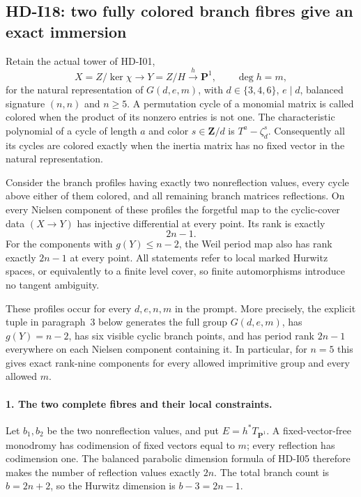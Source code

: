 \subsection{HD-I18: two fully colored branch fibres give an exact immersion}
\label{sec:HD-I18}

Retain the actual tower of HD-I01,
\[
 X=Z/\ker\chi\longrightarrow Y=Z/H
                 \xrightarrow{h}\mathbf P^1,
 \qquad \deg h=m,
\]
for the natural representation of $G(d,e,m)$, with
$d\in\{3,4,6\}$, $e\mid d$, balanced signature $(n,n)$ and
$n\geq5$. A permutation cycle of a monomial matrix is called
colored when the product of its nonzero entries is not one.
The characteristic polynomial of a cycle of length $a$ and color
$s\in\mathbf Z/d$ is $T^a-\zeta_d^s$. Consequently all its
cycles are colored exactly when the inertia matrix has no fixed
vector in the natural representation.

Consider the branch profiles having exactly two nonreflection
values, every cycle above either of them colored, and all remaining
branch matrices reflections. On every Nielsen component of these
profiles the forgetful map to the cyclic-cover data $(X\to Y)$ has
injective differential at every point. Its rank is exactly
\begin{equation}
                         2n-1.                       \tag{I18.1}
\end{equation}
For the components with $g(Y)\leq n-2$, the Weil period map also
has rank exactly $2n-1$ at every point. All statements refer to
local marked Hurwitz spaces, or equivalently to a finite level
cover, so finite automorphisms introduce no tangent ambiguity.

These profiles occur for every $d,e,n,m$ in the prompt. More
precisely, the explicit tuple in paragraph~3 below generates the
full group $G(d,e,m)$, has $g(Y)=n-2$, has six visible cyclic
branch points, and has period rank $2n-1$ everywhere on each
Nielsen component containing it. In particular, for $n=5$ this
gives exact rank-nine components for every allowed imprimitive
group and every allowed $m$.

\paragraph{1. The two complete fibres and their local constraints.}
Let $b_1,b_2$ be the two nonreflection values, and put
$E=h^*T_{\mathbf P^1}$. A fixed-vector-free monodromy has
codimension of fixed vectors equal to $m$; every reflection has
codimension one. The balanced parabolic dimension formula of
HD-I05 therefore makes the number of reflection values exactly
$2n$. The total branch count is $b=2n+2$, so the Hurwitz
dimension is $b-3=2n-1$.


